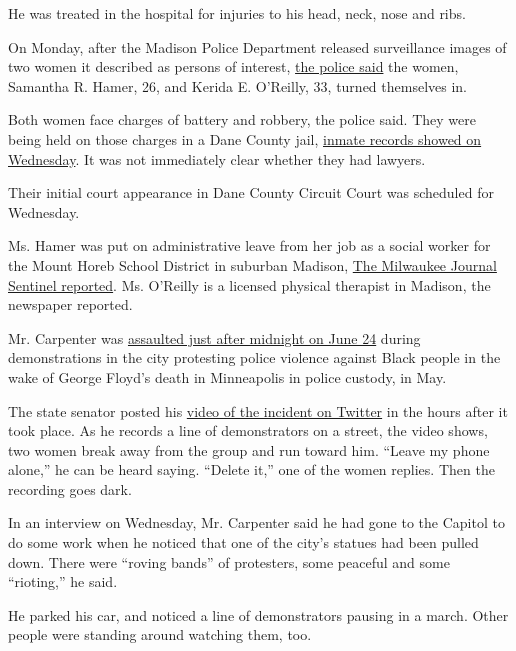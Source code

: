He was treated in the hospital for injuries to his head, neck, nose and
ribs.

On Monday, after the Madison Police Department released surveillance
images of two women it described as persons of interest,
\href{https://www.cityofmadison.com/police/newsroom/incidentreports/incident.cfm?id=26641}{the
police said} the women, Samantha R. Hamer, 26, and Kerida E. O'Reilly,
33, turned themselves in.

Both women face charges of battery and robbery, the police said. They
were being held on those charges in a Dane County jail,
\href{https://danesheriff.com/Inmates/Detail/660287}{inmate records
showed on Wednesday}. It was not immediately clear whether they had
lawyers.

Their initial court appearance in Dane County Circuit Court was
scheduled for Wednesday.

Ms. Hamer was put on administrative leave from her job as a social
worker for the Mount Horeb School District in suburban Madison,
\href{https://www.jsonline.com/story/news/politics/2020/07/28/school-social-worker-therapist-arrested-assault-senator/5527959002/}{The
Milwaukee Journal Sentinel reported}. Ms. O'Reilly is a licensed
physical therapist in Madison, the newspaper reported.

Mr. Carpenter was
\href{https://www.nytimes3xbfgragh.onion/2020/06/24/us/tim-carpenter-wisconsin-senator-protest.html}{assaulted
just after midnight on June 24} during demonstrations in the city
protesting police violence against Black people in the wake of George
Floyd's death in Minneapolis in police custody, in May.

The state senator posted his
\href{https://twitter.com/TimCarpenterMKE/status/1275716467007328258}{video
of the incident on Twitter} in the hours after it took place. As he
records a line of demonstrators on a street, the video shows, two women
break away from the group and run toward him. ``Leave my phone alone,''
he can be heard saying. ``Delete it,'' one of the women replies. Then
the recording goes dark.

In an interview on Wednesday, Mr. Carpenter said he had gone to the
Capitol to do some work when he noticed that one of the city's statues
had been pulled down. There were ``roving bands'' of protesters, some
peaceful and some ``rioting,'' he said.

He parked his car, and noticed a line of demonstrators pausing in a
march. Other people were standing around watching them, too.

